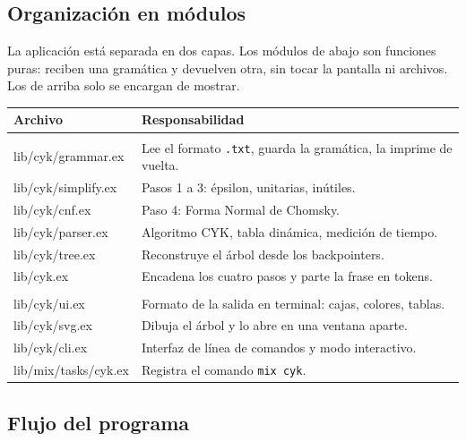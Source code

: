\documentclass[11pt,a4paper]{article}
\begin{document}
\subsection{Organización en módulos}

La aplicación está separada en dos capas. Los módulos de abajo son funciones
puras: reciben una gramática y devuelven otra, sin tocar la pantalla ni
archivos. Los de arriba solo se encargan de mostrar.

\begin{center}
\begin{tabular}{@{}>{\ttfamily}l p{9.2cm}@{}}
\toprule
\textrm{\textbf{Archivo}} & \textbf{Responsabilidad} \\
\midrule
\multicolumn{2}{@{}l}{\textit{Lógica (funciones puras)}} \\
lib/cyk/grammar.ex  & Lee el formato \texttt{.txt}, guarda la gramática, la imprime de vuelta. \\
lib/cyk/simplify.ex & Pasos 1 a 3: épsilon, unitarias, inútiles. \\
lib/cyk/cnf.ex      & Paso 4: Forma Normal de Chomsky. \\
lib/cyk/parser.ex   & Algoritmo CYK, tabla dinámica, medición de tiempo. \\
lib/cyk/tree.ex     & Reconstruye el árbol desde los backpointers. \\
lib/cyk.ex          & Encadena los cuatro pasos y parte la frase en tokens. \\
\midrule
\multicolumn{2}{@{}l}{\textit{Presentación}} \\
lib/cyk/ui.ex       & Formato de la salida en terminal: cajas, colores, tablas. \\
lib/cyk/svg.ex      & Dibuja el árbol y lo abre en una ventana aparte. \\
lib/cyk/cli.ex      & Interfaz de línea de comandos y modo interactivo. \\
lib/mix/tasks/cyk.ex & Registra el comando \texttt{mix cyk}. \\
\bottomrule
\end{tabular}
\end{center}

\subsection{Flujo del programa}
\end{document}
